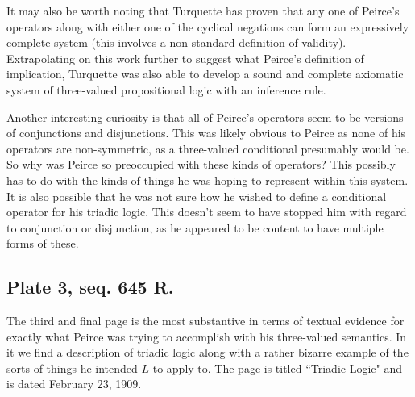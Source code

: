 \documentclass[12pt]{article}
\begin{document}
It may also be worth noting that Turquette has proven that any one of Peirce's operators along with either one of the cyclical negations can form an expressively complete system (this involves a non-standard definition of validity). Extrapolating on this work further to suggest what Peirce's definition of implication, Turquette was also able to develop a sound and complete axiomatic system of three-valued propositional logic with an inference rule.

Another interesting curiosity is that all of Peirce's operators seem to be versions of conjunctions and disjunctions. This was likely obvious to Peirce as none of his operators are non-symmetric, as a three-valued conditional presumably would be. So why was Peirce so preoccupied with these kinds of operators? This possibly has to do with the kinds of things he was hoping to represent within this system. It is also possible that he was not sure how he wished to define a conditional operator for his triadic logic. This doesn't seem to have stopped him with regard to conjunction or disjunction, as he appeared to be content to have multiple forms of these.

\subsection{Plate 3, seq. 645 R.}

The third and final page is the most substantive in terms of textual evidence for exactly what Peirce was trying to accomplish with his three-valued semantics. In it we find a description of triadic logic along with a rather bizarre example of the sorts of things he intended $L$ to apply to. The page is titled ``Triadic Logic" and is dated February 23, 1909. 
\end{document}
